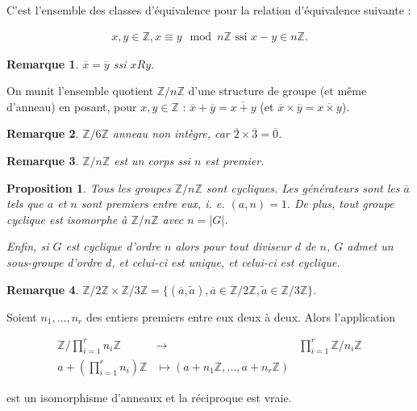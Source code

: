 \documentclass[french]{book}
\newtheorem{prop}{Proposition}[section]
\newtheorem*{remark}{Remarque}
\begin{document}
C'est l'ensemble des classes d'équivalence pour la relation d'équivalence suivante :

\begin{gather*}
  x, y \in \mathbb{Z}, x \equiv y \mod n \mathbb{Z} \text{ ssi } x - y \in n\mathbb{Z}.
\end{gather*}

\begin{remark}
  $\overline{x} = \overline{y}  $ ssi $x R y$.
\end{remark}

On munit l'ensemble quotient $\mathbb{Z}/{ n }\mathbb{Z}$ d'une structure de groupe (et même d'anneau) en posant, pour $x, y \in \mathbb{Z}$ : $\overline{x}+ \overline{y} = \overline{x+y}   $ (et $\overline{x} \times \overline{y} = \overline{x \times y}   $).

\begin{remark}
  $\mathbb{Z}/{ 6 }\mathbb{Z}$ anneau non intègre, car $ \overline{2} \times \overline{3} = \overline{0}   $.
\end{remark}

\begin{remark}
  $\mathbb{Z}/{ n }\mathbb{Z}$ est un corps ssi $n$ est premier.
\end{remark}

\begin{prop}
  Tous les groupes $\mathbb{Z}/{ n }\mathbb{Z}$ sont cycliques. Les générateurs sont les $\overline{a} $ tels que $a$ et $n$ sont premiers entre eux, i. e. $(a,n) = 1$. De plus, tout groupe cyclique est isomorphe à $\mathbb{Z}/{ n }\mathbb{Z}$ avec $n = \lvert G \rvert$.

  Enfin, si $G$ est cyclique d'ordre $n$ alors pour tout diviseur $d$ de $n$, $G$ admet un sous-groupe d'ordre $d$, et celui-ci est unique, et celui-ci est cyclique.
\end{prop}

\begin{remark}
  $\mathbb{Z}/{ 2 }\mathbb{Z} \times \mathbb{Z}/{ 3 }\mathbb{Z} = \{ (\overline{a}, \tilde{a} ), \overline{a} \in \mathbb{Z}/{ 2 }\mathbb{Z}, \tilde{a} \in \mathbb{Z}/{ 3 }\mathbb{Z}  \} $.
\end{remark}

\begin{thm}
  Soient $n_1, \dots, n_r$ des entiers premiers entre eux deux à deux. Alors l'application

  \[
  \begin{array}{lll}
  \mathbb{Z}/{ \prod_{i=1}^{r} n_i  }\mathbb{Z} & \longrightarrow & \prod_{i=1}^{r } \mathbb{Z}/{ n_i }\mathbb{Z}  \\
  a + (\prod_{i=1}^{r} n_i ) \mathbb{Z} & \longmapsto (a+ n_1 \mathbb{Z}, \dots, a+ n_r \mathbb{Z})
  \end{array}
  \]

  est un isomorphisme d'anneaux et la réciproque est vraie.
\end{thm}
\end{document}
